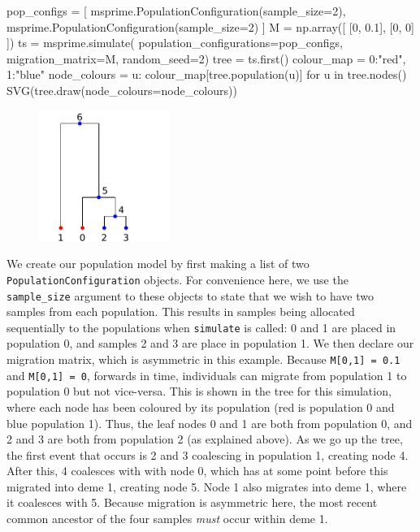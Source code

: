 \documentclass[graybox]{svmult}
\newcommand{\includenbimage}[1]{\begin{center}\texttt{[image: \#1]}\end{center}}
\begin{document}
\begin{pythoncode}
pop_configs = [
    msprime.PopulationConfiguration(sample_size=2),
    msprime.PopulationConfiguration(sample_size=2)
]
M = np.array([
    [0, 0.1],
    [0, 0]
])
ts  = msprime.simulate(
    population_configurations=pop_configs, migration_matrix=M,
    random_seed=2)
tree = ts.first()
colour_map = {0:"red", 1:"blue"}
node_colours = {
    u: colour_map[tree.population(u)] for u in tree.nodes()}
SVG(tree.draw(node_colours=node_colours))
\end{pythoncode}

\begin{figure}
  \begin{center}
    \includegraphics[width=0.38\textwidth]{images/simulations_26_0.pdf}
  \end{center}
\end{figure}
%

    We create our population model by first making a list of two
\texttt{PopulationConfiguration} objects. For convenience here, we use
the \texttt{sample\_size} argument to these objects to state that we
wish to have two samples from each population. This results in samples
being allocated sequentially to the populations when \texttt{simulate}
is called: 0 and 1 are placed in population 0, and samples 2 and 3 are
place in population 1. We then declare our migration matrix, which is
asymmetric in this example. Because \texttt{M{[}0,1{]}\ =\ 0.1} and
\texttt{M{[}0,1{]}\ =\ 0}, forwards in time, individuals can migrate
from population 1 to population 0 but not vice-versa. This is shown in
the tree for this simulation, where each node has been coloured by its
population (red is population 0 and blue population 1). Thus, the leaf
nodes 0 and 1 are both from population 0, and 2 and 3 are both from
population 2 (as explained above). As we go up the tree, the first event
that occurs is 2 and 3 coalescing in population 1, creating node 4.
After this, 4 coalesces with with node 0, which has at some point before
this migrated into deme 1, creating node 5. Node 1 also migrates into
deme 1, where it coalesces with 5. Because migration is asymmetric here,
the most recent common ancestor of the four samples \emph{must} occur
within deme 1.
\end{document}
